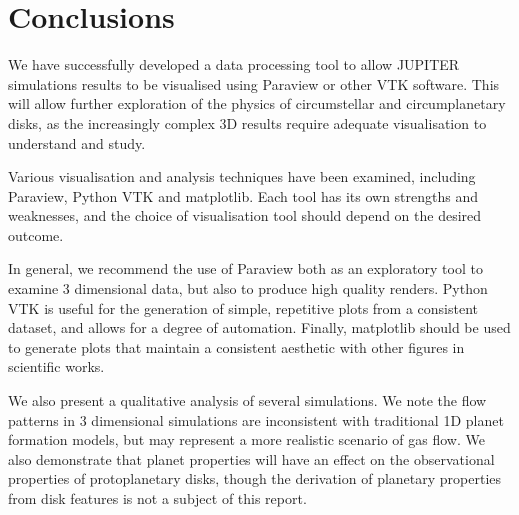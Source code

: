 \documentclass[preprint2]{aastex62}
\begin{document}


\section{Conclusions}\label{sec:con}
We have successfully developed a data processing tool to allow JUPITER simulations results to be visualised using Paraview or other VTK software. This will allow further exploration of the physics of circumstellar and circumplanetary disks, as the increasingly complex 3D results require adequate visualisation to understand and study. 

Various visualisation and analysis techniques have been examined, including Paraview, Python VTK and matplotlib. 
Each tool has its own strengths and weaknesses, and the choice of visualisation tool should depend on the desired outcome.

In general, we recommend the use of Paraview both as an exploratory tool to examine 3 dimensional data, but also to produce high quality renders. 
Python VTK is useful for the generation of simple, repetitive plots from a consistent dataset, and allows for a degree of automation. 
Finally, matplotlib should be used to generate plots that maintain a consistent aesthetic with other figures in scientific works.

We also present a qualitative analysis of several simulations. 
We note the flow patterns in 3 dimensional simulations are inconsistent with traditional 1D planet formation models, but may represent a more realistic scenario of gas flow.
We also demonstrate that planet properties will have an effect on the observational properties of protoplanetary disks, though the derivation of planetary properties from disk features is not a subject of this report.
\end{document}

